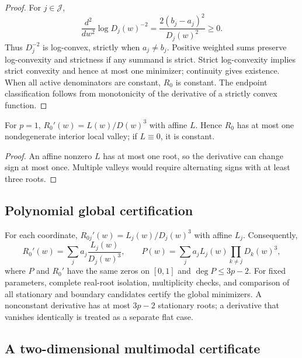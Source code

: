 \begin{proof}
For $j\in\mathcal J$,
\begin{equation}
 \frac{d^2}{dw^2}\log D_j(w)^{-2}=\frac{2(b_j-a_j)^2}{D_j(w)^2}\ge0.
\end{equation}
Thus $D_j^{-2}$ is log-convex, strictly when $a_j\ne b_j$. Positive weighted sums preserve log-convexity and strictness if any summand is strict. Strict log-convexity implies strict convexity and hence at most one minimizer; continuity gives existence. When all active denominators are constant, $R_0$ is constant. The endpoint classification follows from monotonicity of the derivative of a strictly convex function.
\end{proof}

\begin{proposition}\label{supp:prop:p1-shape}
For $p=1$, $R_0'(w)=L(w)/D(w)^3$ with affine $L$. Hence $R_0$ has at most one nondegenerate interior local valley; if $L\equiv0$, it is constant.
\end{proposition}

\begin{proof}
An affine nonzero $L$ has at most one root, so the derivative can change sign at most once. Multiple valleys would require alternating signs with at least three roots.
\end{proof}

\subsection{Polynomial global certification}

For each coordinate, $R_{0j}'(w)=L_j(w)/D_j(w)^3$ with affine $L_j$. Consequently,
\begin{equation}
 R_0'(w)=\sum_j a_j\frac{L_j(w)}{D_j(w)^3},\qquad
 P(w)=\sum_j a_jL_j(w)\prod_{k\ne j}D_k(w)^3,
\end{equation}
where $P$ and $R_0'$ have the same zeros on $[0,1]$ and $\deg P\le3p-2$. For fixed parameters, complete real-root isolation, multiplicity checks, and comparison of all stationary and boundary candidates certify the global minimizers. A nonconstant derivative has at most $3p-2$ stationary roots; a derivative that vanishes identically is treated as a separate flat case.

\subsection{A two-dimensional multimodal certificate}

